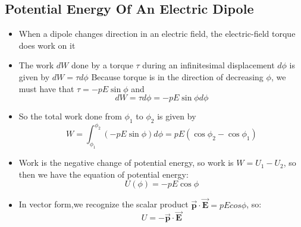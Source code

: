 \documentclass[11pt, a4paper]{article}
\begin{document}
\subsection{Potential Energy Of An Electric Dipole}
\begin{itemize}
    \item When a dipole changes direction in an electric field, the electric-field torque
        does work on it
    \item The work $dW$ done by a torque $\tau$ during an infinitesimal displacement
        $d\phi$ is given by $dW = \tau d\phi$ Because torque is in the direction of
        decreasing $\phi$, we must have that $\tau = -pE\sin\phi$ and
        \begin{equation}
            dW = \tau d\phi = -pE\sin\phi d\phi
        \end{equation}
    \item So the total work done from $\phi_1$ to $\phi_2$ is given by
        \begin{equation}
            W= \int_{\phi_1}^{\phi_2} (-pE\sin\phi)d\phi = pE(\cos\phi_2 - \cos\phi_1)
        \end{equation}
    \item Work is the negative change of potential energy, so work is $W = U_1 - U_2$, so
        then we have the equation of potential energy:
        \begin{equation}
            U(\phi) = -pE\cos\phi
        \end{equation}
    \item In vector form,we recognize the scalar product
        $\vec{\mathbf{p}}\cdot \vec{\mathbf{E}} = pEcos\phi$, so:
        \begin{equation}
            U = -\vec{\mathbf{p}} \cdot \vec{\mathbf{E}}
        \end{equation}
\end{itemize}
\end{document}
